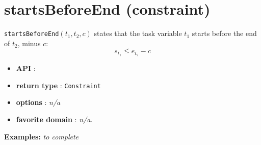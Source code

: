 \section{startsBeforeEnd (constraint)}\label{startsbeforeend:startsbeforeendconstraint}\hypertarget{startsbeforeend:startsbeforeendconstraint}{}
\begin{notedef}
  \texttt{startsBeforeEnd}$(t_1,t_2,c)$ states that the task variable $t_1$ starts before the end of $t_2$, minus $c$:
  $$s_{t_{1}} \le e_{t_{2}} - c$$
\end{notedef}

\begin{itemize}
	\item \textbf{API} :
	\item \textbf{return type} : \texttt{Constraint}
	\item \textbf{options} : \emph{n/a}
	\item \textbf{favorite domain} : \emph{n/a}.
\end{itemize}

\textbf{Examples:}
%
\emph{to complete}
